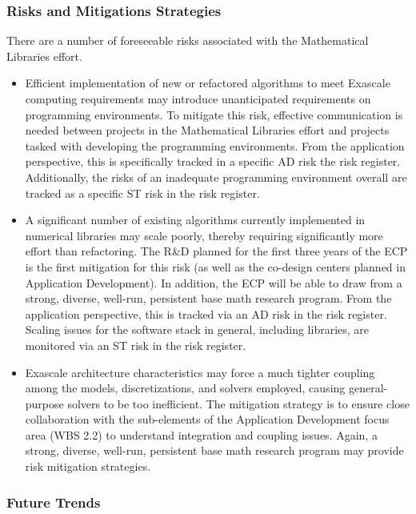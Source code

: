 \subsubsection{Risks and Mitigations Strategies}
There are a number of foreseeable risks associated with the Mathematical Libraries effort.
\begin{itemize}
	\item Efficient implementation of new or refactored algorithms to meet Exascale computing requirements may introduce unanticipated requirements on programming environments. To mitigate this risk, effective communication is needed between projects in the Mathematical Libraries effort and projects tasked with developing the programming environments. From the application perspective, this is specifically tracked in a specific AD risk the risk register. Additionally, the risks of an inadequate programming environment overall are tracked as a specific ST risk in the risk register.
	\item A significant number of existing algorithms currently implemented in numerical libraries may scale poorly, thereby requiring significantly more effort than refactoring. The R\&D planned for the first three years of the ECP is the first mitigation for this risk (as well as the co-design centers planned in Application Development). In addition, the ECP will be able to draw from a strong, diverse, well-run, persistent base math research program. From the application perspective, this is tracked via an AD risk in the risk register. Scaling issues for the software stack in general, including libraries, are monitored via an ST risk in the risk register.
	\item Exascale architecture characteristics may force a much tighter coupling among the models, discretizations, and solvers employed, causing general-purpose solvers to be too inefficient. The mitigation strategy is to ensure close collaboration with the sub-elements of the Application Development focus area (WBS 2.2) to understand integration and coupling issues. Again, a strong, diverse, well-run, persistent base math research program may provide risk mitigation strategies.
\end{itemize}

\subsubsection{Future Trends}
